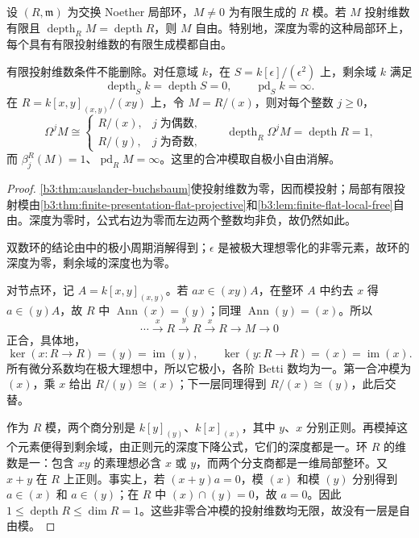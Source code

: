 \begin{corollary}\label{b3:cor:finite-pd-maximal-depth-free}
	设 \((R,\mathfrak m)\) 为交换 Noether 局部环，\(M\ne0\) 为有限生成的 \(R\) 模。若 \(M\) 投射维数有限且 \(\operatorname{depth}_RM=\operatorname{depth}R\)，则 \(M\) 自由。特别地，深度为零的这种局部环上，每个具有有限投射维数的有限生成模都自由。

	有限投射维数条件不能删除。对任意域 \(k\)，在 \(S=k[\epsilon]/(\epsilon^2)\) 上，剩余域 \(k\) 满足
	\[
		\operatorname{depth}_Sk=\operatorname{depth}S=0,\qquad \operatorname{pd}_Sk=\infty.
	\]
	在 \(R=k[x,y]_{(x,y)}/(xy)\) 上，令 \(M=R/(x)\)，则对每个整数 \(j\ge0\)，
	\[
		\Omega^jM\cong
		\begin{cases}
			R/(x),&j\;\text{为偶数},\\
			R/(y),&j\;\text{为奇数},
		\end{cases}
		\qquad \operatorname{depth}_R\Omega^jM=\operatorname{depth}R=1,
	\]
	而 \(\beta_j^R(M)=1\)、\(\operatorname{pd}_RM=\infty\)。这里的合冲模取自极小自由消解。
\end{corollary}
\begin{proof}
	\cref{b3:thm:auslander-buchsbaum}使投射维数为零，因而模投射；局部有限投射模由\cref{b3:thm:finite-presentation-flat-projective}和\cref{b3:lem:finite-flat-local-free}自由。深度为零时，公式右边为零而左边两个整数均非负，故仍然如此。

	双数环的结论由中的极小周期消解得到；\(\epsilon\) 是被极大理想零化的非零元素，故环的深度为零，剩余域的深度也为零。

	对节点环，记 \(A=k[x,y]_{(x,y)}\)。若 \(ax\in(xy)A\)，在整环 \(A\) 中约去 \(x\) 得 \(a\in(y)A\)，故 \(R\) 中 \(\operatorname{Ann}(x)=(y)\)；同理 \(\operatorname{Ann}(y)=(x)\)。所以
	\[
		\cdots\xrightarrow{x}R\xrightarrow{y}R\xrightarrow{x}R \longrightarrow M\longrightarrow0
	\]
	正合，具体地，
	\[
		\ker(x:R\to R)=(y)=\operatorname{im}(y),\qquad \ker(y:R\to R)=(x)=\operatorname{im}(x).
	\]
	所有微分系数均在极大理想中，所以它极小，各阶 Betti 数均为一。第一合冲模为 \((x)\)，乘 \(x\) 给出 \(R/(y)\cong(x)\)；下一层同理得到 \(R/(x)\cong(y)\)，此后交替。

	作为 \(R\) 模，两个商分别是 \(k[y]_{(y)}\)、\(k[x]_{(x)}\)，其中 \(y\)、\(x\) 分别正则。再模掉这个元素便得到剩余域，由正则元的深度下降公式，它们的深度都是一。环 \(R\) 的维数是一：包含 \(xy\) 的素理想必含 \(x\) 或 \(y\)，而两个分支商都是一维局部整环。又 \(x+y\) 在 \(R\) 上正则。事实上，若 \((x+y)a=0\)，模 \((x)\) 和模 \((y)\) 分别得到 \(a\in(x)\) 和 \(a\in(y)\)；在 \(R\) 中 \((x)\cap(y)=0\)，故 \(a=0\)。因此 \(1\le\operatorname{depth}R\le\dim R=1\)。这些非零合冲模的投射维数均无限，故没有一层是自由模。
\end{proof}

